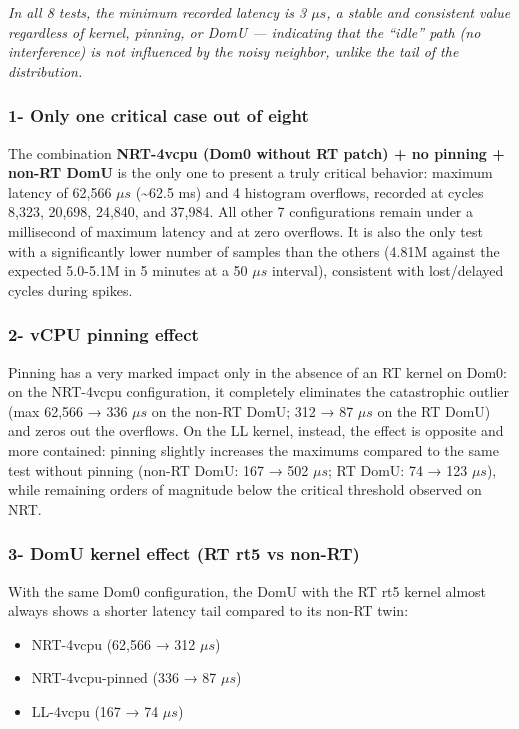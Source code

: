\emph{In all 8 tests, the minimum recorded latency is 3 $\mu s$, a stable and
consistent value regardless of kernel, pinning, or DomU --- indicating
that the ``idle'' path (no interference) is not influenced by the noisy
neighbor, unlike the tail of the distribution.}

\subsubsection{1- Only one critical case out of
eight}\label{only-one-critical-case-out-of-eight}

The combination \textbf{NRT-4vcpu (Dom0 without RT patch) + no pinning +
non-RT DomU} is the only one to present a truly critical behavior:
maximum latency of 62,566 $\mu s$ (\textasciitilde62.5 ms) and 4 histogram
overflows, recorded at cycles 8,323, 20,698, 24,840, and 37,984. All
other 7 configurations remain under a millisecond of maximum latency and
at zero overflows. It is also the only test with a significantly lower
number of samples than the others (4.81M against the expected 5.0-5.1M
in 5 minutes at a 50 $\mu s$ interval), consistent with lost/delayed cycles
during spikes.

\subsubsection{2- vCPU pinning effect}\label{vcpu-pinning-effect}

Pinning has a very marked impact only in the absence of an RT kernel on
Dom0: on the NRT-4vcpu configuration, it completely eliminates the
catastrophic outlier (max 62,566 → 336 $\mu s$ on the non-RT DomU; 312 → 87
$\mu s$ on the RT DomU) and zeros out the overflows. On the LL kernel,
instead, the effect is opposite and more contained: pinning slightly
increases the maximums compared to the same test without pinning (non-RT
DomU: 167 → 502 $\mu s$; RT DomU: 74 → 123 $\mu s$), while remaining orders of
magnitude below the critical threshold observed on NRT.

\subsubsection{3- DomU kernel effect (RT rt5 vs
non-RT)}\label{domu-kernel-effect-rt-rt5-vs-non-rt}

With the same Dom0 configuration, the DomU with the RT rt5 kernel almost
always shows a shorter latency tail compared to its non-RT twin:

\begin{itemize}
\item
  NRT-4vcpu (62,566 → 312 $\mu s$)
\item
  NRT-4vcpu-pinned (336 → 87 $\mu s$)
\item
  LL-4vcpu (167 → 74 $\mu s$)
\end{itemize}

